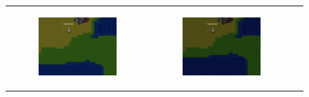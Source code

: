 \documentclass[11pt,letterpaper]{article}
\begin{document}
\begin{figure}
{\begin{tabular}{ccc}
\begin{subfigure}[b]{0.33\textwidth}\includegraphics[width=\textwidth]{figures/bottleneck-1.jpg}\caption{}\label{fig:bottleneck-a}\end{subfigure}&
\begin{subfigure}[b]{0.33\textwidth}\includegraphics[width=\textwidth]{figures/bottleneck-2.jpg}\caption{}\label{fig:bottleneck-b}\end{subfigure}&

\end{tabular}}
\end{figure}
\end{document}
